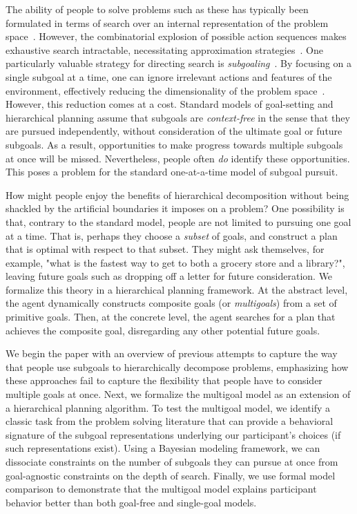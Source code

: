 \documentclass[10pt,letterpaper]{article}
\begin{document}
The ability of people to solve problems such as these has typically been formulated in terms of search over an internal representation of the problem space~\citep{NewellSimon1972}. However, the combinatorial explosion of possible action sequences makes exhaustive search intractable, necessitating approximation strategies~\citep{Huys2015}. One particularly valuable strategy for directing search is \textit{subgoaling}~\citep{Donnarumma2016}. By focusing on a single subgoal at a time, one can ignore irrelevant actions and features of the environment, effectively reducing the dimensionality of the problem space~\citep{Dietterich2000}. However, this reduction comes at a cost. Standard models of goal-setting and hierarchical planning assume that subgoals are \textit{context-free} in the sense that they are pursued independently, without consideration of the ultimate goal or future subgoals. As a result, opportunities to make progress towards multiple subgoals at once will be missed. Nevertheless, people often \textit{do} identify these opportunities. This poses a problem for the standard one-at-a-time model of subgoal pursuit.


How might people enjoy the benefits of hierarchical decomposition without being shackled by the artificial boundaries it imposes on a problem?
One possibility is that, contrary to the standard model, people are not limited to pursuing one goal at a time. That is, perhaps they choose a \textit{subset} of goals, and construct a plan that is optimal with respect to that subset.
They might ask themselves, for example, "what is the fastest way to get to both a grocery store and a library?", leaving future goals such as dropping off a letter for future consideration.
We formalize this theory in a hierarchical planning framework.
At the abstract level, the agent dynamically constructs composite goals (or \textit{multigoals}) from a set of primitive goals. Then, at the concrete level, the agent searches for a plan that achieves the composite goal, disregarding any other potential future goals. 

We begin the paper with an overview of previous attempts to capture the way that people use subgoals to hierarchically decompose problems, emphasizing how these approaches fail to capture the flexibility that people have to consider multiple goals at once. Next, we formalize the multigoal model as an extension of a hierarchical planning algorithm. To test the multigoal model, we identify a classic task from the problem solving literature that can provide a behavioral signature of the subgoal representations underlying our participant's choices (if such representations exist). Using a Bayesian modeling framework, we can dissociate constraints on the number of subgoals they can pursue at once from goal-agnostic constraints on the depth of search. Finally, we use formal model comparison to demonstrate that the multigoal model explains participant behavior better than both goal-free and single-goal models.
\end{document}
